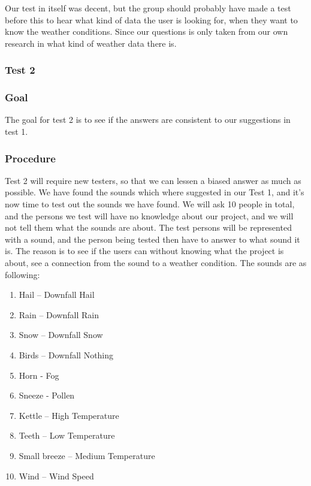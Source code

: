 Our test in itself was decent, but the group should probably have made a test before this to hear what kind of data the user is looking for, when they want to know the weather conditions. 
Since our questions is only taken from our own research in what kind of weather data there is.




\subsubsection{Test 2} %
\label{ssub:test_2}

\subsubsection*{Goal} %
\label{ssub:test_2_goal}

The goal for test 2 is to see if the answers are consistent to our suggestions in test 1.


\subsubsection*{Procedure} %
\label{ssub:test_2_procedure}

Test 2 will require new testers, so that we can lessen a biased answer as much as possible. 
We have found the sounds which where suggested in our Test 1, and it’s now time to test out the sounds we have found. 
We will ask 10 people in total, and the persons we test will have no knowledge about our project, and we will not tell them what the sounds are about. 
The test persons will be represented with a sound, and the person being tested then have to answer to what sound it is. 
The reason is to see if the users can without knowing what the project is about, see a connection from the sound to a weather condition. The sounds are as following:

\begin{enumerate}
    \item Hail – Downfall Hail
    \item Rain – Downfall Rain
    \item Snow – Downfall Snow
    \item Birds – Downfall Nothing
    \item Horn - Fog
    \item Sneeze - Pollen
    \item Kettle – High Temperature 
    \item Teeth – Low Temperature
    \item Small breeze – Medium Temperature
    \item Wind – Wind Speed
\end{enumerate}

